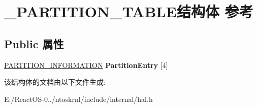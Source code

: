 \hypertarget{struct___p_a_r_t_i_t_i_o_n___t_a_b_l_e}{}\section{\+\_\+\+P\+A\+R\+T\+I\+T\+I\+O\+N\+\_\+\+T\+A\+B\+L\+E结构体 参考}
\label{struct___p_a_r_t_i_t_i_o_n___t_a_b_l_e}
\subsection*{Public 属性}
\begin{DoxyCompactItemize}
\item 
\mbox{\label{struct___p_a_r_t_i_t_i_o_n___t_a_b_l_e_a7df68655d5aba1940f82bf1a1da0d513}} 
\hyperlink{struct___p_a_r_t_i_t_i_o_n___i_n_f_o_r_m_a_t_i_o_n}{P\+A\+R\+T\+I\+T\+I\+O\+N\+\_\+\+I\+N\+F\+O\+R\+M\+A\+T\+I\+ON} {\bfseries Partition\+Entry} \mbox{[}4\mbox{]}
\end{DoxyCompactItemize}


该结构体的文档由以下文件生成\+:\begin{DoxyCompactItemize}
\item 
E\+:/\+React\+O\+S-\/0../ntoskrnl/include/internal/hal.\+h\end{DoxyCompactItemize}
